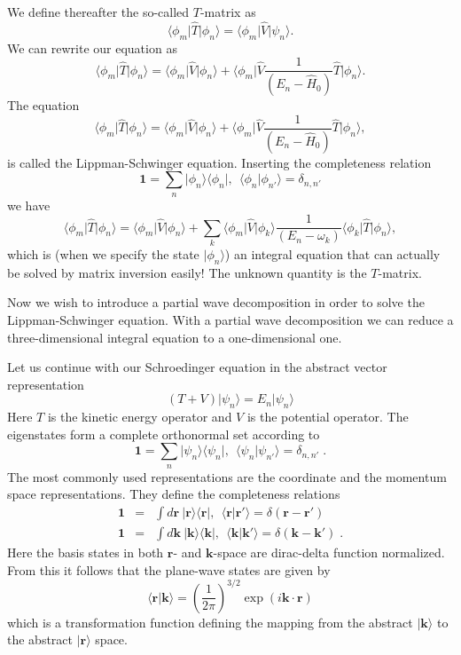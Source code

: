 \documentclass[graybox,sectrefs,envcountresetchap,open=right]{svmonodo}
\begin{document}
We define thereafter the so-called $T$-matrix as
\[
\langle \phi_m \vert\hat{T}\vert \phi_n \rangle=\langle \phi_m \vert\hat{V}\vert \psi_n \rangle.
\]
We can rewrite our equation as
\[
\langle \phi_m \vert\hat{T}\vert \phi_n \rangle =\langle \phi_m \vert\hat{V}\vert\phi_n \rangle+\langle \phi_m \vert\hat{V}\frac{1}{(E_n -\hat{H}_0)}\hat{T}\vert \phi_n \rangle.
\]
The equation
\[
\langle \phi_m \vert\hat{T}\vert \phi_n \rangle =\langle \phi_m \vert\hat{V}\vert\phi_n \rangle+\langle \phi_m \vert\hat{V}\frac{1}{(E_n -\hat{H}_0)}\hat{T}\vert \phi_n \rangle,
\]
is called the Lippman-Schwinger equation. Inserting the completeness relation
\[ 
\mathbf{1} = \sum_n \vert \phi_n\rangle\langle \phi_n \vert, \:\: \langle \phi_n\vert \phi_{n'} \rangle = \delta_{n,n'}
\]
we have 
\[
\langle \phi_m \vert\hat{T}\vert \phi_n \rangle =\langle \phi_m \vert\hat{V}\vert\phi_n \rangle+\sum_k \langle \phi_m \vert\hat{V}\vert \phi_k\rangle\frac{1}{(E_n -\omega_k)}\langle \phi_k \vert\hat{T}\vert \phi_n \rangle,
\]
which is (when we specify the state $\vert\phi_n \rangle$) an integral equation that can actually be solved by matrix inversion easily! The unknown quantity is the $T$-matrix.

Now we wish to introduce a partial wave decomposition in order to solve the Lippman-Schwinger equation. With a partial wave decomposition we can reduce a three-dimensional integral equation to a one-dimensional one. 

\noindent
Let us continue with our Schroedinger equation in the abstract vector representation
\[
\left(T + V\right)\vert\psi_n\rangle = E_n\vert\psi_n \rangle 
\]
Here $T$ is the kinetic energy operator and $V$ is the potential operator. 
The eigenstates form a complete orthonormal set according to 
\[ 
\mathbf{1}=\sum_n\vert\psi_n\rangle\langle\psi_n\vert, \:\: \langle\psi_n\vert\psi_{n'}\rangle =\delta_{n,n'} \; .
\]
The most commonly used representations are the coordinate and
the momentum space representations. They define the completeness relations 
\begin{eqnarray*}
 \mathbf{1}&=&  \int d\mathbf{r} \:\vert\mathbf{r} \rangle \langle \mathbf{r}\vert, \:\: \langle  \mathbf{r}\vert  \mathbf{r'} \rangle = \delta ( \mathbf{r}-\mathbf{r'}) \\
\mathbf{1} &=& \int d\mathbf{k} \:\vert  \mathbf{k}\rangle \langle \mathbf{k}\vert, \:\: \langle\mathbf{k}\vert  \mathbf{k'} \rangle = \delta ( \mathbf{k}-\mathbf{k'})  \; .
\end{eqnarray*}
Here the basis states in  both $\mathbf{r}$- and $\mathbf{k}$-space are dirac-delta 
function normalized. From this it follows that the plane-wave states are given by
\[
\langle\mathbf{r}\vert\mathbf{k} \rangle =\left(\frac{1}{2\pi}\right)^{3/2}\exp\left(i\mathbf{k\cdot r} \right)
\]
which is a transformation function defining the mapping from the abstract 
$\vert\mathbf{k}\rangle$ to the abstract $\vert\mathbf{r}\rangle $ space.
\end{document}

